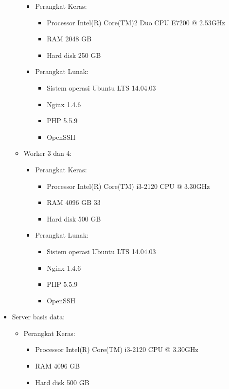 \documentclass{ta-its}
\begin{document}
\begin{itemize}
\begin{itemize}
\begin{itemize}
						\item Perangkat Keras:
						\begin{itemize}
							\item Processor Intel(R) Core(TM)2 Duo CPU E7200
							@ 2.53GHz
							\item RAM 2048 GB
							\item Hard disk 250 GB
						\end{itemize}
						\item Perangkat Lunak:
						\begin{itemize}
							\item Sistem operasi Ubuntu LTS 14.04.03
							\item Nginx 1.4.6
							\item PHP 5.5.9
							\item OpenSSH
						\end{itemize}
					\end{itemize}
					\item Worker 3 dan 4:
					\begin{itemize}
						\item Perangkat Keras:
						\begin{itemize}
							\item Processor Intel(R) Core(TM) i3-2120 CPU @
							3.30GHz
							\item RAM 4096 GB
							33
							\item Hard disk 500 GB
						\end{itemize}
						\item Perangkat Lunak:
						\begin{itemize}
							\item Sistem operasi Ubuntu LTS 14.04.03
							\item Nginx 1.4.6
							\item PHP 5.5.9
							\item OpenSSH
						\end{itemize}
					\end{itemize}
				\end{itemize}
				\item Server basis data:
				\begin{itemize}
					\item Perangkat Keras:
					\begin{itemize}
						\item Processor Intel(R) Core(TM) i3-2120 CPU @ 3.30GHz
						\item RAM 4096 GB
						\item Hard disk 500 GB

\end{itemize}
\end{itemize}
\end{itemize}
\end{document}
